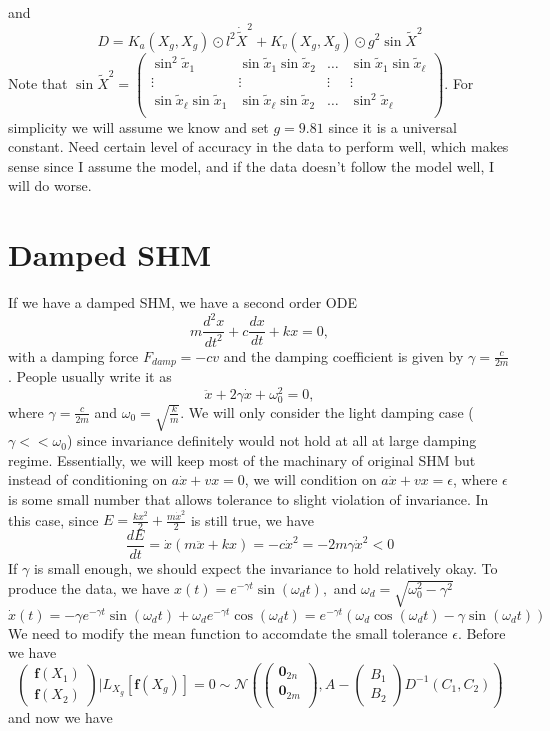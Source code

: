 \documentclass{article}
\begin{document}
and 
$$
D = K_a(X_g, X_g) \odot l^2\dot{\tilde{X}}^2 + K_v(X_g, X_g) \odot g^2\sin\tilde{X}^2
$$
Note that $\sin\tilde{X}^2=\begin{pmatrix}
  \sin^2\tilde{x}_1 & \sin\tilde{x}_1\sin\tilde{x}_2 & \dots & \sin\tilde{x}_1\sin\tilde{x}_{\ell} \\
  \vdots & \vdots & \vdots & \vdots \\
  \sin\tilde{x}_{\ell}\sin\tilde{x}_1 & \sin\tilde{x}_{\ell}\sin\tilde{x}_2 & \dots & \sin^2\tilde{x}_{\ell} \\
\end{pmatrix}.$ 
For simplicity we will assume we know and set $g=9.81$ since it is a universal constant.
Need certain level of accuracy in the data to perform well, which makes sense since I assume the model, and if the data doesn't follow the model well, I will do worse.


\section*{Damped SHM}
If we have a damped SHM, we have a second order ODE 
$$
m\frac{d^2x}{dt^2}+c\frac{dx}{dt}+kx=0,
$$ with a damping force $F_{damp}=-cv$ and the damping coefficient is given by $\gamma=\frac{c}{2m}$.
People usually write it as 
$$
\ddot{x}+2\gamma\dot{x}+\omega_0^2 = 0, 
$$ where $\gamma=\frac{c}{2m}$ and $\omega_0=\sqrt{\frac{k}{m}}.$
We will only consider the light damping case ($\gamma << \omega_0$) since invariance definitely would not hold at all at large damping regime.
Essentially, we will keep most of the machinary of original SHM but instead of conditioning on $a\dot{x}+vx=0$, we will condition on $a\dot{x}+vx=\epsilon$, where $\epsilon$ is some small number that allows tolerance to slight violation of invariance.
In this case, since $E=\frac{kx^2}{2}+\frac{m\dot{x}^2}{2}$ is still true, we have $$\frac{dE}{dt}=\dot{x}(m\ddot{x}+kx)=-c\dot{x}^2=-2m\gamma\dot{x}^2<0$$
If $\gamma$ is small enough, we should expect the invariance to hold relatively okay.
To produce the data, we have $x(t)=e^{-\gamma t}\sin(\omega_dt),$ and $\omega_d = \sqrt{\omega_0^2-\gamma^2}$ $\dot{x}(t)=-\gamma e^{-\gamma t}\sin(\omega_dt)+\omega_de^{-\gamma t}\cos(\omega_dt)=e^{-\gamma t}(\omega_d\cos(\omega_dt)-\gamma \sin(\omega_dt))$
We need to modify the mean function to accomdate the small tolerance $\epsilon.$
Before we have
$$
\begin{pmatrix}
  \mathbf{f}(X_1)\\
  \mathbf{f}(X_2)
\end{pmatrix}|L_{X_g}[\mathbf{f}(X_g)]=0
\sim\mathcal{N}
\left(
\begin{pmatrix}
  \mathbf{0}_{2n}\\
  \mathbf{0}_{2m}\\
\end{pmatrix}
,
A-\begin{pmatrix}
  B_1 \\B_2
\end{pmatrix}D^{-1}\left(C_1, C_2\right)
\right)
$$
and now we have 
\end{document}
